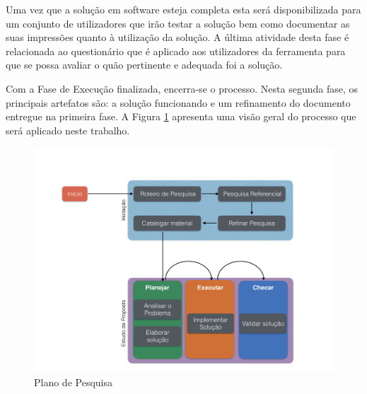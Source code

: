Uma vez que a solução em software esteja completa esta será disponibilizada para um conjunto de utilizadores que irão testar a solução bem como documentar as suas impressões quanto à utilização da solução. A última atividade desta fase é relacionada ao questionário que é aplicado aos utilizadores da ferramenta para que se possa avaliar o quão pertinente e adequada foi a solução. 

Com a Fase de Execução finalizada, encerra-se o processo. Nesta segunda fase, os principais artefatos são: a solução funcionando e um refinamento do documento entregue na primeira fase. A Figura \ref{Rotulo} apresenta uma visão geral do processo que será aplicado neste trabalho.

\graphicspath{{figuras/}}
\begin{figure}[h!]
\centering
\includegraphics[scale=0.40]{TCCMetodologia}
\caption{Plano de Pesquisa}
\label{Rotulo}
\end{figure}

